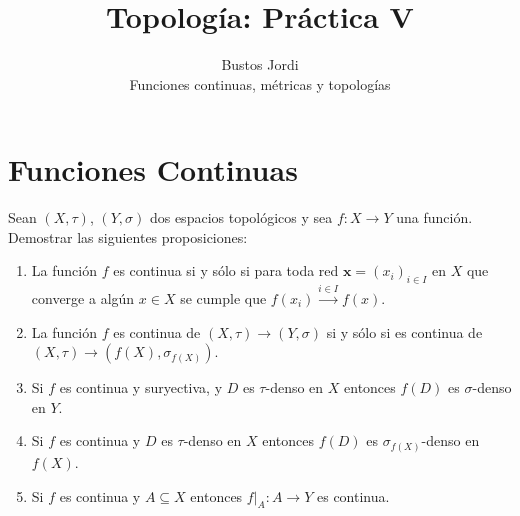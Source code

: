 \documentclass{article}
\theoremstyle{plain}
\theoremstyle{definition}
\newenvironment{ejercicio}[1]{\begin{trivlist}
\item[\hskip \labelsep {\bfseries Ejercicio}\hskip \labelsep {\bfseries #1.}]}{\end{trivlist}}
\begin{document}
\title{Topología: Práctica V}
\author{Bustos Jordi\\Funciones continuas, métricas y topologías}

\maketitle

\section*{Funciones Continuas}

\begin{ejercicio}{1}
    Sean \( (X, \tau) \), \( (Y, \sigma) \) dos espacios topológicos y sea \( f : X \to Y \) una función. Demostrar las siguientes proposiciones:
    \begin{enumerate}
        \item La función \( f \) es continua si y sólo si para toda red \( \mathbf{x} = {(x_i)}_{i \in I} \) en \( X \) que converge a algún \( x \in X \) se cumple que \( f(x_i) \xrightarrow{i \in I} f(x) \).
        \item La función \( f \) es continua de \( (X, \tau) \to (Y, \sigma) \) si y sólo si es continua de \( (X, \tau) \to (f(X), \sigma_{f(X)}) \).
        \item Si \( f \) es continua y suryectiva, y \( D \) es \( \tau \)-denso en \( X \) entonces \( f(D) \) es \( \sigma \)-denso en \( Y \).
        \item Si \( f \) es continua y \( D \) es \( \tau \)-denso en \( X \) entonces \( f(D) \) es \( \sigma_{f(X)} \)-denso en \( f(X) \).
        \item Si \( f \) es continua y \( A \subseteq X \) entonces \( f|_A : A \to Y \) es continua.
    \end{enumerate}
\end{ejercicio}
\end{document}
